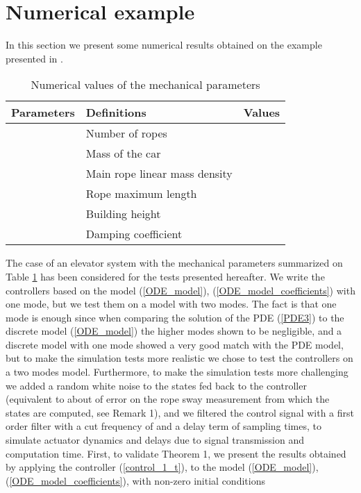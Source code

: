 \documentclass[letterpaper, 11 pt, conference]{ieeeconf}
\begin{document}
\section{Numerical example}\label{section3}
In this section we present some numerical results obtained on the
example presented in \cite{K011}.
\begin{table}\hspace*{-0.5cm}
\begin{center}
\begin{tabular}{|l|l|l|}
\hline {\bf Parameters} & {\bf Definitions} & {\bf Values}\\\hline
 & Number of ropes &\\
 & Mass of the car & \\
 & Main rope linear mass density & \\
 & Rope maximum length & \\
 & Building height & \\
 & Damping coefficient & \\
\hline
\end{tabular}\caption{Numerical values of the mechanical parameters}
\label{table1}
\end{center}
\end{table}
The case of an elevator system with the mechanical parameters
summarized on Table \ref{table1} has been considered for the tests
presented hereafter. We write the controllers based on the model
(\ref{ODE_model}), (\ref{ODE_model_coefficients}) with one mode,
but we test them on a model with two modes. The fact is that one
mode is enough since when comparing the solution of the PDE
(\ref{PDE3}) to the discrete model (\ref{ODE_model}) the higher
modes shown to be negligible, and a discrete model with one mode
showed a very good match with the PDE model, but to make the
simulation tests more realistic we chose to test the controllers
on a two modes model. Furthermore, to make the simulation tests
more challenging we added a random white noise to the states fed
back to the controller (equivalent to about  of error on
the rope sway measurement from which the states are computed, see
Remark 1), and we filtered the control signal with a first order
filter with a cut frequency of  and a delay term of 
sampling times, to simulate actuator dynamics and delays due to
signal transmission and computation time. First, to validate
Theorem 1, we present the results obtained by applying the
controller (\ref{control_1_t}), to the model (\ref{ODE_model}),
(\ref{ODE_model_coefficients}), with non-zero initial conditions
\end{document}
